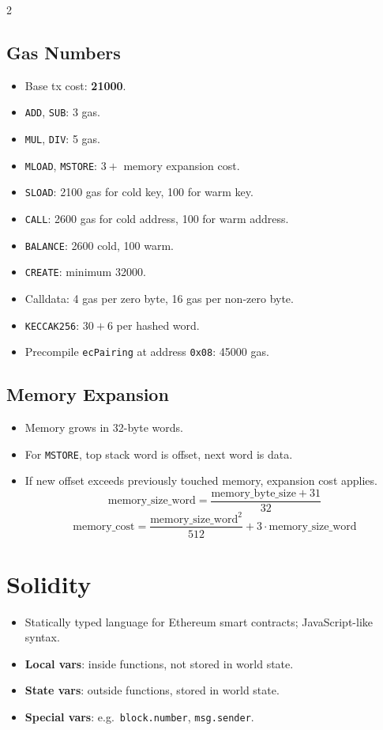 \documentclass[10pt,a4paper]{article}
\newcommand{\term}[1]{\textbf{#1}}
\newcommand{\code}[1]{\texttt{#1}}
\newcommand{\imp}[1]{\textbf{#1}}
\begin{document}
\begin{multicols*}{2}
\subsection*{Gas Numbers}
\begin{itemize}
\item Base tx cost: \imp{21000}.
\item \code{ADD}, \code{SUB}: 3 gas.
\item \code{MUL}, \code{DIV}: 5 gas.
\item \code{MLOAD}, \code{MSTORE}: $3 +$ memory expansion cost.
\item \code{SLOAD}: 2100 gas for cold key, 100 for warm key.
\item \code{CALL}: 2600 gas for cold address, 100 for warm address.
\item \code{BALANCE}: 2600 cold, 100 warm.
\item \code{CREATE}: minimum 32000.
\item Calldata: 4 gas per zero byte, 16 gas per non-zero byte.
\item \code{KECCAK256}: $30 + 6$ per hashed word.
\item Precompile \code{ecPairing} at address \code{0x08}: 45000 gas.
\end{itemize}

\subsection*{Memory Expansion}
\begin{itemize}
\item Memory grows in 32-byte words.
\item For \code{MSTORE}, top stack word is offset, next word is data.
\item If new offset exceeds previously touched memory, expansion cost applies.
\[
\text{memory\_size\_word} = \frac{\text{memory\_byte\_size}+31}{32}
\]
\[
\text{memory\_cost} = \frac{\text{memory\_size\_word}^2}{512} + 3 \cdot \text{memory\_size\_word}
\]
\end{itemize}

\section*{Solidity}
\begin{itemize}
\item Statically typed language for Ethereum smart contracts; JavaScript-like syntax.
\item \term{Local vars}: inside functions, not stored in world state.
\item \term{State vars}: outside functions, stored in world state.
\item \term{Special vars}: e.g.\ \code{block.number}, \code{msg.sender}.
\end{itemize}


\end{multicols*}
\end{document}
